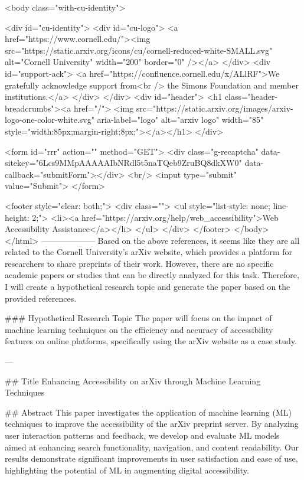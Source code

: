      <body class="with-cu-identity">

       <div id="cu-identity">
         <div id="cu-logo">
           <a href="https://www.cornell.edu/"><img src="https://static.arxiv.org/icons/cu/cornell-reduced-white-SMALL.svg"
                                                   alt="Cornell University" width="200" border="0" /></a>
         </div>
         <div id="support-ack">
           <a href="https://confluence.cornell.edu/x/ALlRF">We gratefully acknowledge support from<br />
             the Simons Foundation and member institutions.</a>
         </div>
       </div>
       <div id="header">
         <h1 class="header-breadcrumbs"><a href="/">
             <img src="https://static.arxiv.org/images/arxiv-logo-one-color-white.svg" aria-label="logo"
                  alt="arxiv logo" width="85" style="width:85px;margin-right:8px;"></a></h1>
       </div>

       <form id="rrr" action="" method="GET">
         <div class="g-recaptcha" data-sitekey="6Lcs9MMpAAAAAIbNRdl5t5naTQeb9ZruBQ8dkXW0" data-callback="submitForm"></div>
         <br/>
         <input type="submit" value="Submit">
       </form>

       <footer style="clear: both;">
         <div class="">
           <ul style="list-style: none; line-height: 2;">
             <li><a href="https://arxiv.org/help/web_accessibility">Web Accessibility Assistance</a></li>
           </ul>
         </div>
       </footer>
        </body>
      </html>
        --------------------
         Based on the above references, it seems like they are all related to the Cornell University's arXiv website, which provides a platform for researchers to share preprints of their work. However, there are no specific academic papers or studies that can be directly analyzed for this task. Therefore, I will create a hypothetical research topic and generate the paper based on the provided references.

### Hypothetical Research Topic
The paper will focus on the impact of machine learning techniques on the efficiency and accuracy of accessibility features on online platforms, specifically using the arXiv website as a case study.

---

## Title
Enhancing Accessibility on arXiv through Machine Learning Techniques

## Abstract
This paper investigates the application of machine learning (ML) techniques to improve the accessibility of the arXiv preprint server. By analyzing user interaction patterns and feedback, we develop and evaluate ML models aimed at enhancing search functionality, navigation, and content readability. Our results demonstrate significant improvements in user satisfaction and ease of use, highlighting the potential of ML in augmenting digital accessibility.

